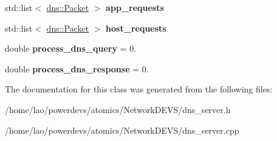 \begin{DoxyCompactItemize}
\item 
std\+::list$<$ \hyperlink{structdns_1_1Packet}{dns\+::\+Packet} $>$ {\bfseries app\+\_\+requests}\hypertarget{classdns__server_a4df4c84961c098bba0dcc5fe41e52564}{}\label{classdns__server_a4df4c84961c098bba0dcc5fe41e52564}

\item 
std\+::list$<$ \hyperlink{structdns_1_1Packet}{dns\+::\+Packet} $>$ {\bfseries host\+\_\+requests}\hypertarget{classdns__server_a0ed8a7cc91535c4bbcff5320503dc8ba}{}\label{classdns__server_a0ed8a7cc91535c4bbcff5320503dc8ba}

\item 
double {\bfseries process\+\_\+dns\+\_\+query} = 0.\hypertarget{classdns__server_a9444ae1982f78180dd1c8d905b46d3c3}{}\label{classdns__server_a9444ae1982f78180dd1c8d905b46d3c3}

\item 
double {\bfseries process\+\_\+dns\+\_\+response} = 0.\hypertarget{classdns__server_a5b577ff9d1e88181cd5c753c6ea31c07}{}\label{classdns__server_a5b577ff9d1e88181cd5c753c6ea31c07}

\end{DoxyCompactItemize}


The documentation for this class was generated from the following files\+:\begin{DoxyCompactItemize}
\item 
/home/lao/powerdevs/atomics/\+Network\+D\+E\+V\+S/dns\+\_\+server.\+h\item 
/home/lao/powerdevs/atomics/\+Network\+D\+E\+V\+S/dns\+\_\+server.\+cpp\end{DoxyCompactItemize}
